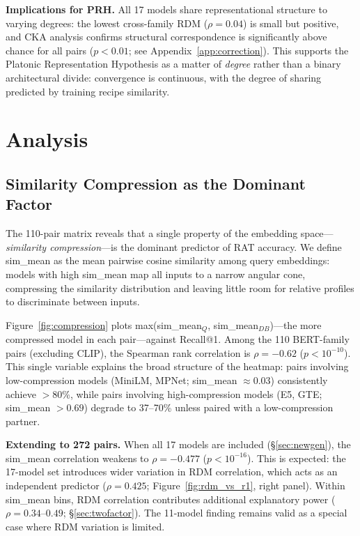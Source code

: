\documentclass{article}
\begin{document}
\textbf{Implications for PRH.} All 17 models share representational structure to varying degrees: the lowest cross-family RDM ($\rho = 0.04$) is small but positive, and CKA analysis confirms structural correspondence is significantly above chance for all pairs ($p < 0.01$; see Appendix~\ref{app:correction}). This supports the Platonic Representation Hypothesis \citep{huh2024platonic} as a matter of \emph{degree} rather than a binary architectural divide: convergence is continuous, with the degree of sharing predicted by training recipe similarity.

\section{Analysis}
\label{sec:analysis}

\subsection{Similarity Compression as the Dominant Factor}
\label{sec:collapse}

The 110-pair matrix reveals that a single property of the embedding space---\emph{similarity compression}---is the dominant predictor of RAT accuracy. We define sim\_mean as the mean pairwise cosine similarity among query embeddings: models with high sim\_mean map all inputs to a narrow angular cone, compressing the similarity distribution and leaving little room for relative profiles to discriminate between inputs.

Figure~\ref{fig:compression} plots max(sim\_mean$_Q$, sim\_mean$_{DB}$)---the more compressed model in each pair---against Recall@1. Among the 110 BERT-family pairs (excluding CLIP), the Spearman rank correlation is $\rho = -0.62$ ($p < 10^{-10}$). This single variable explains the broad structure of the heatmap: pairs involving low-compression models (MiniLM, MPNet; sim\_mean $\approx 0.03$) consistently achieve $>$80\%, while pairs involving high-compression models (E5, GTE; sim\_mean $> 0.69$) degrade to 37--70\% unless paired with a low-compression partner.

\textbf{Extending to 272 pairs.} When all 17 models are included (\S\ref{sec:newgen}), the sim\_mean correlation weakens to $\rho = -0.477$ ($p < 10^{-16}$). This is expected: the 17-model set introduces wider variation in RDM correlation, which acts as an independent predictor ($\rho = 0.425$; Figure~\ref{fig:rdm_vs_r1}, right panel). Within sim\_mean bins, RDM correlation contributes additional explanatory power ($\rho = 0.34$--$0.49$; \S\ref{sec:twofactor}). The 11-model finding remains valid as a special case where RDM variation is limited.
\end{document}
